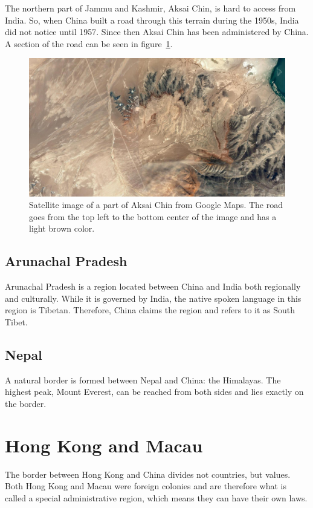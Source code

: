 \documentclass[conference]{IEEEtran}
\begin{document}
	The northern part of Jammu and Kashmir, Aksai Chin, is hard to access from India. So, when China built a road through this terrain during the 1950s, India did not notice until 1957. Since then Aksai Chin has been administered by China. A section of the road can be seen in figure~\ref{pic:india_jammuAndKashmir_road}.
	
	\begin{figure}[t]
	\centering
	\includegraphics[width=\linewidth]{img/india_jammuAndKashmir_road.png}
	\caption{Satellite image of a part of Aksai Chin from Google Maps. The road goes from the top left to the bottom center of the image and has a light brown color.}
	\label{pic:india_jammuAndKashmir_road}
	\end{figure}
	
	\subsection{Arunachal Pradesh}
	Arunachal Pradesh is a region located between China and India both regionally and culturally. While it is governed by India, the native spoken language in this region is Tibetan. Therefore, China claims the region and refers to it as South Tibet.
	
	\subsection{Nepal}
	A natural border is formed between Nepal and China: the Himalayas. The highest peak, Mount Everest, can be reached from both sides and lies exactly on the border.
	
	\section{Hong Kong and Macau}
	The border between Hong Kong and China divides not countries, but values. Both Hong Kong and Macau were foreign colonies and are therefore what is called a special administrative region, which means they can have their own laws.
	
\end{document}

